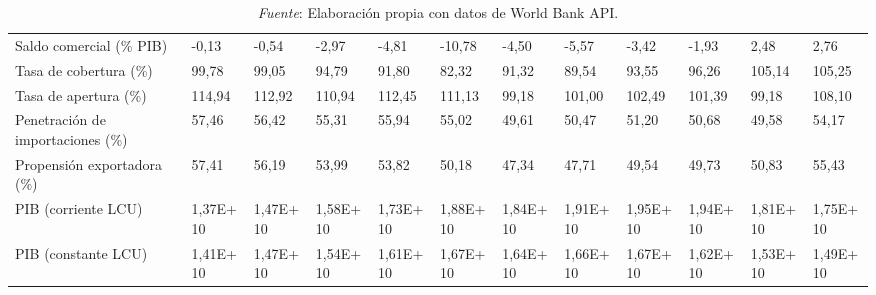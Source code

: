 \documentclass[a4paper,openright,12pt]{book}
\begin{document}
\begin{table}[]
{\begin{tabular}{@{}llllllllllll@{}}
        Saldo comercial (\% PIB)                            & -0,13    & -0,54     & -2,97     & -4,81     & -10,78    & -4,50     & -5,57     & -3,42     & -1,93     & 2,48      & 2,76      \\
        Tasa de cobertura (\%)                              & 99,78    & 99,05     & 94,79     & 91,80     & 82,32     & 91,32     & 89,54     & 93,55     & 96,26     & 105,14    & 105,25    \\
        Tasa de apertura (\%)                               & 114,94   & 112,92    & 110,94    & 112,45    & 111,13    & 99,18     & 101,00    & 102,49    & 101,39    & 99,18     & 108,10    \\
        Penetración de importaciones (\%)                   & 57,46    & 56,42     & 55,31     & 55,94     & 55,02     & 49,61     & 50,47     & 51,20     & 50,68     & 49,58     & 54,17     \\
        Propensión exportadora (\%)                         & 57,41    & 56,19     & 53,99     & 53,82     & 50,18     & 47,34     & 47,71     & 49,54     & 49,73     & 50,83     & 55,43     \\
        PIB (corriente LCU)                                 & 1,37E+10 & 1,47E+10  & 1,58E+10  & 1,73E+10  & 1,88E+10  & 1,84E+10  & 1,91E+10  & 1,95E+10  & 1,94E+10  & 1,81E+10  & 1,75E+10  \\
        PIB (constante LCU)                                 & 1,41E+10 & 1,47E+10  & 1,54E+10  & 1,61E+10  & 1,67E+10  & 1,64E+10  & 1,66E+10  & 1,67E+10  & 1,62E+10  & 1,53E+10  & 1,49E+10  \\ \bottomrule
        \end{tabular}}
    \caption*{\textit{Fuente}: Elaboración propia con datos de World Bank API.}

\end{table}
\end{document}
